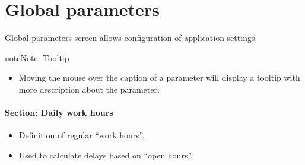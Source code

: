 \documentclass[letterpaper,10pt,english]{sphinxmanual}
\begin{document}
\section{Global parameters}
\label{Administration:administration-global-parameters-label}\label{Administration:global-parameters}\label{Administration:index-2}
Global parameters screen allows configuration of application settings.

\begin{notice}{note}{Note:}
Tooltip
\begin{itemize}
\item {} 
Moving the mouse over the caption of a parameter will display a tooltip with more description about the parameter.

\end{itemize}
\end{notice}
\paragraph{Section: Daily work hours}
\begin{itemize}
\item {} 
Definition of regular “work hours”.

\item {} 
Used to calculate delays based on “open hours”.

\end{itemize}
\end{document}

